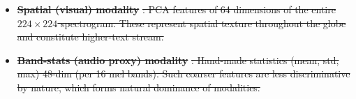 \documentclass[fleqn,10pt]{wlscirep}
\providecommand{\DIFdel}[1]{{\protect\color{red}\sout{#1}}} %
\providecommand{\DIFdelbegin}{} %
\begin{document}
\DIFdelbegin %
\begin{itemize}%
\item%
\textbf{\DIFdel{Spatial (visual) modality}}%
\DIFdel{: PCA features of 64 dimensions of the entire $224\times224$ spectrogram. These represent spatial texture throughout the globe and constitute higher-text stream. }%
\item%
\textbf{\DIFdel{Band-stats (audio proxy) modality}}%
\DIFdel{: Hand-made statistics (mean, std, max) 48-dim (per 16 mel bands). Such coarser features are less discriminative by nature, which forms natural dominance of modalities. }
\end{itemize}%
\end{document}
